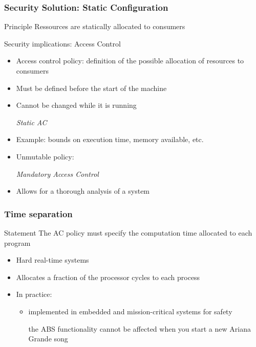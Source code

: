 \begin{reveals}
\begin{frame}
  \frametitle{Security Solution: Static Configuration}
  
  \begin{block}{Principle}
    Ressources are statically allocated to consumers
  \end{block}

  \begin{block} {Security implications: Access Control}
    \begin{itemize}[<+->]
    \item Access control policy: definition of the possible allocation
      of resources to consumers
    \item Must be defined before the start of the machine
    \item Cannot be changed while it is running
      \begin{center}
        \emph{Static AC}
      \end{center}
    \item Example: bounds on execution time, memory available, etc.
    \item Unmutable policy:
      \begin{center}
        \emph{Mandatory Access Control}
      \end{center}
    \item Allows for a thorough analysis of a system
    \end{itemize}
  \end{block}

\end{frame}


\begin{frame}
  \frametitle{Time separation}

  \begin{block}{Statement}
    The AC policy must specify the computation time allocated to each
    program
  \end{block}

  \begin{itemize}
  \item Hard real-time systems
  \item Allocates a fraction of the processor cycles to each process
  \item In practice:
    \begin{itemize}
    \item implemented in embedded and mission-critical systems for
      safety
      \begin{center}
        the ABS functionality cannot be affected when you start a new
        Ariana Grande song
      \end{center}
    \end{itemize}
  \end{itemize}


\end{frame}
\end{reveals}
